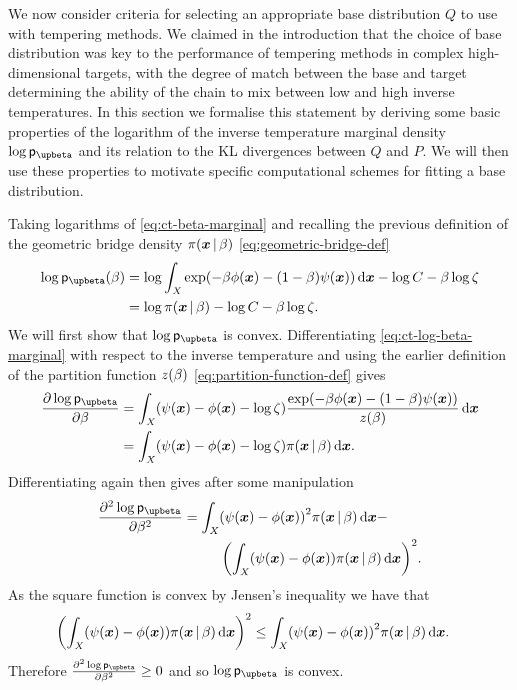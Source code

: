 We now consider criteria for selecting an appropriate base distribution $Q$ to use with tempering methods. We claimed in the introduction that the choice of base distribution was key to the performance of tempering methods in complex high-dimensional targets, with the degree of match between the base and target determining the ability of the chain to mix between low and high inverse temperatures. In this section we formalise this statement by deriving some basic properties of the logarithm of the inverse temperature marginal density $\log\pden{\upbeta}$ and its relation to the \ac{KL} divergences between $Q$ and $P$. We will then use these properties to motivate specific computational schemes for fitting a base distribution.

Taking logarithms of \eqref{eq:ct-beta-marginal} and recalling the previous definition of the geometric bridge density $\pi(\boldsymbol{x}\operatorname{|}\beta)$ \eqref{eq:geometric-bridge-def}
\begin{align} \nonumber
  \log\pden{\upbeta}(\beta) &=
  \log \int_{\set{X}} \exp\lpa - \beta\phi(\vct{x}) - (1-\beta)\psi(\vct{x})\rpa\,\dr\vct{x}
  - \log C - \beta \log \zeta
  \\ \label{eq:ct-log-beta-marginal}
  &= \log\pi(\vct{x}\gvn\beta) - \log C - \beta\log\zeta.
\end{align}
We will first show that $\log\pden{\upbeta}$ is convex. Differentiating \eqref{eq:ct-log-beta-marginal} with respect to the inverse temperature and using the earlier definition of the partition function $z(\beta)$ \eqref{eq:partition-function-def} gives
\begin{align}\nonumber
  \pd{\log\pden{\upbeta}}{\beta} &=
  \int_{\set{X}} 
  \lpa \psi(\vct{x}) - \phi(\vct{x}) - \log\zeta \rpa
  \frac{\exp\lpa - \beta\phi(\vct{x}) - (1-\beta)\psi(\vct{x})\rpa}{\partfunc(\beta)}
  \,\dr\vct{x}\\
  &=\label{eq:ct-log-beta-marginal-deriv}
  \int_{\set{X}} 
  \lpa \psi(\vct{x}) - \phi(\vct{x}) - \log\zeta \rpa \pi(\vct{x}\gvn\beta)
  \,\dr\vct{x}.
\end{align}
Differentiating again then gives after some manipulation
\begin{equation}\label{eq:ct-log-beta-marginal-second-deriv}
\begin{split}
  \pd{^2\log\pden{\upbeta}}{\beta^2} &=
  \int_{\set{X}} \lpa \psi(\vct{x}) - \phi(\vct{x})\rpa^2 \pi(\vct{x}\gvn\beta)\,\dr\vct{x} -
  \\&\phantom{=}\qquad
  \lpa
    \int_{\set{X}} \lpa \psi(\vct{x}) - \phi(\vct{x})\rpa\pi(\vct{x}\gvn\beta)\,\dr\vct{x}
  \rpa^2.
\end{split}
\end{equation}
As the square function is convex by Jensen's inequality we have that
\begin{equation*}
\begin{split}
  &\lpa
    \int_{\set{X}} \lpa \psi(\vct{x}) - \phi(\vct{x})\rpa\pi(\vct{x}\gvn\beta)\,\dr\vct{x}
  \rpa^2 \leq
  \int_{\set{X}} \lpa \psi(\vct{x}) - \phi(\vct{x})\rpa^2 \pi(\vct{x}\gvn\beta)\,\dr\vct{x}.
\end{split}
\end{equation*}
Therefore $\pd{^2\log\pden{\upbeta}}{\beta^2} \geq 0$ and so $\log\pden{\upbeta}$ is convex.

